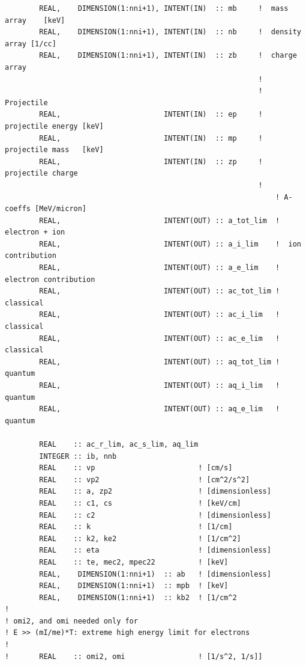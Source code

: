 \documentclass[preprint,12pt,eqsecnum,nofootinbib,amsmath,amssymb]{revtex4}
\begin{document}
{\begin{verbatim}
        REAL,    DIMENSION(1:nni+1), INTENT(IN)  :: mb     !  mass array    [keV]
        REAL,    DIMENSION(1:nni+1), INTENT(IN)  :: nb     !  density array [1/cc]
        REAL,    DIMENSION(1:nni+1), INTENT(IN)  :: zb     !  charge array
                                                           !
                                                           ! Projectile  
        REAL,                        INTENT(IN)  :: ep     !  projectile energy [keV]
        REAL,                        INTENT(IN)  :: mp     !  projectile mass   [keV]
        REAL,                        INTENT(IN)  :: zp     !  projectile charge
                                                           !
                                                               ! A-coeffs [MeV/micron]
        REAL,                        INTENT(OUT) :: a_tot_lim  !  electron + ion
        REAL,                        INTENT(OUT) :: a_i_lim    !  ion contribution
        REAL,                        INTENT(OUT) :: a_e_lim    !  electron contribution
        REAL,                        INTENT(OUT) :: ac_tot_lim !  classical
        REAL,                        INTENT(OUT) :: ac_i_lim   !  classical
        REAL,                        INTENT(OUT) :: ac_e_lim   !  classical
        REAL,                        INTENT(OUT) :: aq_tot_lim !  quantum
        REAL,                        INTENT(OUT) :: aq_i_lim   !  quantum
        REAL,                        INTENT(OUT) :: aq_e_lim   !  quantum

        REAL    :: ac_r_lim, ac_s_lim, aq_lim
        INTEGER :: ib, nnb
        REAL    :: vp                        ! [cm/s]
        REAL    :: vp2                       ! [cm^2/s^2]
        REAL    :: a, zp2                    ! [dimensionless]
        REAL    :: c1, cs                    ! [keV/cm]
        REAL    :: c2                        ! [dimensionless]
        REAL    :: k                         ! [1/cm]
        REAL    :: k2, ke2                   ! [1/cm^2]
        REAL    :: eta                       ! [dimensionless]
        REAL    :: te, mec2, mpec22          ! [keV] 
        REAL,    DIMENSION(1:nni+1)  :: ab   ! [dimensionless]
        REAL,    DIMENSION(1:nni+1)  :: mpb  ! [keV]
        REAL,    DIMENSION(1:nni+1)  :: kb2  ! [1/cm^2
!
! omi2, and omi needed only for 
! E >> (mI/me)*T: extreme high energy limit for electrons
!
!       REAL    :: omi2, omi                 ! [1/s^2, 1/s]]


\end{verbatim}}
\end{document}
